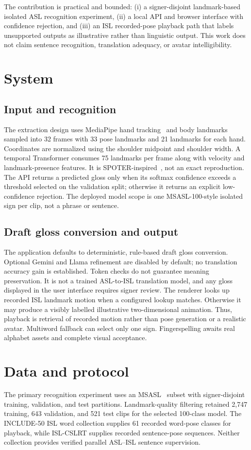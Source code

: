 \documentclass[journal,twocolumn]{IEEEtran}
\begin{document}
The contribution is practical and bounded: (i) a signer-disjoint landmark-based
isolated ASL recognition experiment, (ii) a local API and browser interface with
confidence rejection, and (iii) an ISL recorded-pose playback path that labels
unsupported outputs as illustrative rather than linguistic output. This work does
not claim sentence recognition, translation adequacy, or avatar intelligibility.

\section{System}
\subsection{Input and recognition}
The extraction design uses MediaPipe hand tracking~\cite{zhang2020hands} and
body landmarks sampled into 32 frames with 33
pose landmarks and 21 landmarks for each hand. Coordinates are normalized using
the shoulder midpoint and shoulder width. A temporal Transformer consumes 75
landmarks per frame along with velocity and landmark-presence features. It is
SPOTER-inspired~\cite{bohacek2022spoter}, not an exact reproduction. The API
returns a predicted gloss only when its softmax confidence exceeds a threshold
selected on the validation split; otherwise it returns an explicit low-confidence
rejection. The deployed model scope is one MSASL-100-style isolated sign per
clip, not a phrase or sentence.

\subsection{Draft gloss conversion and output}
The application defaults to deterministic, rule-based draft gloss conversion.
Optional Gemini and Llama refinement are disabled by default; no translation
accuracy gain is established. Token checks do not guarantee meaning preservation. It is not
a trained ASL-to-ISL translation model, and any gloss displayed in the user
interface requires signer review. The renderer looks up recorded ISL landmark
motion when a configured lookup matches. Otherwise it may produce a visibly
labelled illustrative two-dimensional animation. Thus, playback is retrieval of
recorded motion rather than pose generation or a realistic avatar. Multiword
fallback can select only one sign. Fingerspelling awaits real alphabet assets
and complete visual acceptance.

\section{Data and protocol}
The primary recognition experiment uses an MSASL~\cite{joze2019msasl} subset with signer-disjoint
training, validation, and test partitions. Landmark-quality filtering retained
2,747 training, 643 validation, and 521 test clips for the selected 100-class
model. The INCLUDE-50 ISL word collection supplies 61 recorded word-pose classes
for playback, while ISL-CSLRT supplies recorded sentence-pose sequences. Neither
collection provides verified parallel ASL--ISL sentence supervision.
\end{document}
